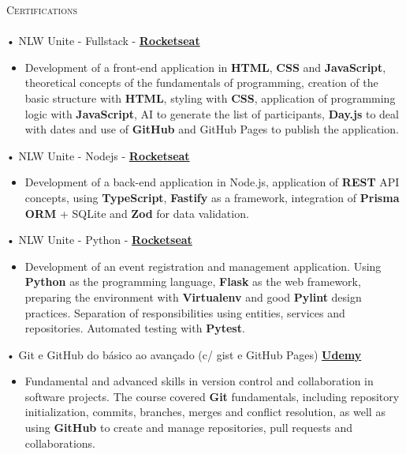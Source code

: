 \documentclass[a4paper]{article}
\newcommand{\lineunder} {
    \vspace*{-8pt} \\
    \hspace*{-18pt} \hrulefill \\
}
\newcommand{\header} [1] {
    {\hspace*{-18pt}\vspace*{6pt} \textsc{#1}}
    \vspace*{-6pt} \lineunder
}
\begin{document}
%
%
\header{Certifications}
\vspace{2mm}
• NLW Unite - Fullstack - \textbf{\href{https://app.rocketseat.com.br/certificates/d3577eb6-c50f-42f3-b595-b96297ef0e05}{Rocketseat}}\\
\begin{itemize}
    \item [] Development of a front-end application in \textbf{HTML}, \textbf{CSS} and \textbf{JavaScript}, theoretical concepts of the fundamentals of programming, creation of the basic structure with \textbf{HTML}, styling with \textbf{CSS}, application of programming logic with \textbf{JavaScript}, AI to generate the list of participants, \textbf{Day.js} to deal with dates and use of \textbf{GitHub} and GitHub Pages to publish the application.
\end{itemize}
\vspace*{1mm}
• NLW Unite - Nodejs - \textbf{\href{https://app.rocketseat.com.br/certificates/a53012ec-27a9-419e-9a8c-86f28508a406}{Rocketseat}}\\
\begin{itemize}
    \item [] Development of a back-end application in Node.js, application of \textbf{REST} API concepts, using \textbf{TypeScript}, \textbf{Fastify} as a framework, integration of \textbf{Prisma ORM} + SQLite and \textbf{Zod} for data validation.
\end{itemize}
\vspace*{1mm}
• NLW Unite - Python - \textbf{\href{https://app.rocketseat.com.br/certificates/c5f21b9b-53c5-4ed7-bc45-430d87cccf77}{Rocketseat}}\\
\begin{itemize}
    \item [] Development of an event registration and management application. Using \textbf{Python} as the programming language, \textbf{Flask} as the web framework, preparing the environment with \textbf{Virtualenv} and good \textbf{Pylint} design practices. Separation of responsibilities using entities, services and repositories. Automated testing with \textbf{Pytest}.
\end{itemize}
\vspace*{6mm}
• Git e GitHub do básico ao avançado (c/ gist e GitHub Pages) \textbf{\href{https://www.udemy.com/certificate/UC-db57cce7-1471-47ff-9828-0e3a4d7da628/}{Udemy}}\\
\begin{itemize}
    \item []  Fundamental and advanced skills in version control and collaboration in software projects. The course covered \textbf{Git} fundamentals, including repository initialization, commits, branches, merges and conflict resolution, as well as using \textbf{GitHub} to create and manage repositories, pull requests and collaborations.
\end{itemize}
\end{document}
